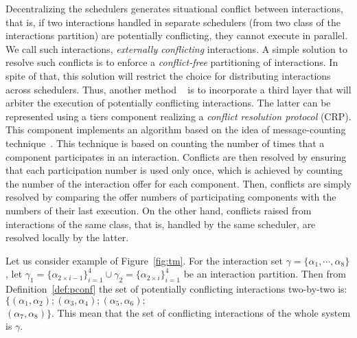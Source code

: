 Decentralizing the schedulers generates situational conflict between interactions, that is, 
if two interactions handled in separate schedulers (from two class of the interactions partition)
are potentially conflicting, they cannot execute in parallel. We call such interactions,
\emph{externally conflicting} interactions. 
A simple solution to resolve such conflicts is to enforce
a \emph{conflict-free} partitioning of interactions. In spite of that, this solution will 
restrict the choice for distributing interactions across schedulers. Thus, another method
~\cite{} is to incorporate a third layer that will arbiter the execution of potentially 
conflicting interactions. The latter can be represented using a tiers component realizing 
a \emph{conflict resolution protocol} (CRP). This
component implements an algorithm based on the idea of message-counting technique~\cite{}.
This technique is based on counting the number of times that a component participates in an 
interaction. Conflicts are then resolved by ensuring that each participation number is used 
only once, which is achieved by counting the number of the interaction offer for each 
component. Then, conflicts are simply resolved by comparing the offer numbers of participating
components with the numbers of their last execution.
On the other hand, conflicts raised from interactions of the same class, that is, handled by 
the same scheduler, are resolved locally by the latter.
\begin{example}\label{exp:partition}
  Let us consider example of Figure~\ref{fig:tm}. For the interaction set $\gamma=\{\alpha_1,
  \cdots,\alpha_8\}$, let $\gamma_1=\{\alpha_{2\times i-1}\}_{i=1}^4\cup\gamma_2=
  \{\alpha_{2\times i}\}_{i=1}^4$ be an interaction partition. Then from 
  Definition~\ref{def:pconf} the set of potentially conflicting interactions two-by-two is:
  $\{(\alpha_1,\alpha_2);(\alpha_3,\alpha_4);(\alpha_5,\alpha_6);$\\$(\alpha_7,\alpha_8)\}$.
  This mean that the set of conflicting interactions of the whole system is $\gamma$.
\end{example}

